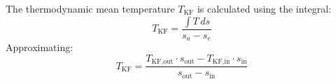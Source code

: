 The thermodynamic mean temperature \( T_{\text{KF}} \) is calculated using the integral:  
\[
T_{\text{KF}} = \frac{\int T \, ds}{s_a - s_e}
\]  
Approximating:  
\[
T_{\text{KF}} = \frac{T_{\text{KF,out}} \cdot s_{\text{out}} - T_{\text{KF,in}} \cdot s_{\text{in}}}{s_{\text{out}} - s_{\text{in}}}
\]